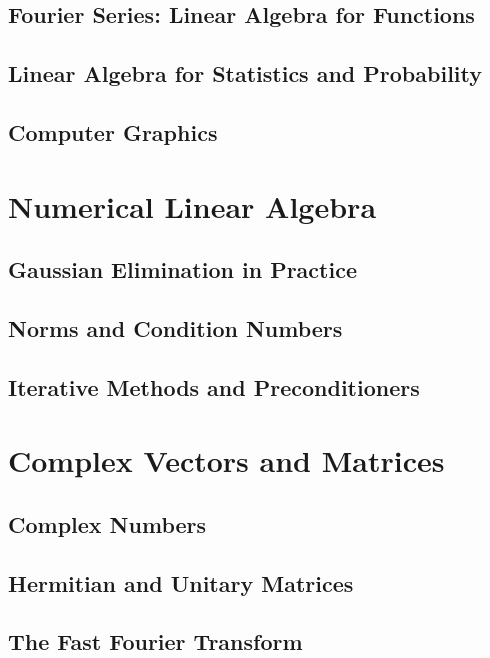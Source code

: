 \documentclass{book}
\begin{document}
\section{Fourier Series: Linear Algebra for Functions}

\section{Linear Algebra for Statistics and Probability}

\section{Computer Graphics}










\chapter{Numerical Linear Algebra}
\section{Gaussian Elimination in Practice}

\section{Norms and Condition Numbers}

\section{Iterative Methods and Preconditioners}










\chapter{Complex Vectors and Matrices}
\section{Complex Numbers}

\section{Hermitian and Unitary Matrices}

\section{The Fast Fourier Transform}
\end{document}

